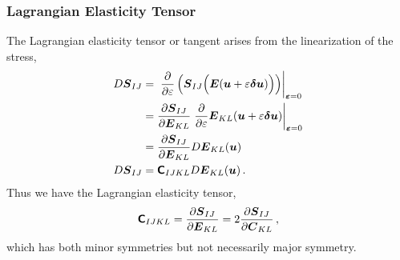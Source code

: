 \documentclass[10pt,letterpaper,oneside]{report}
\newcommand{\ten}[1]{\mbox{\boldmath $#1$}{}}
\newcommand{\tenf}[1]{\mbox{{\sffamily{\bfseries {#1}}}}}
\newcommand{\tens}[1]{\mbox{\boldmath{\scriptsize{$#1$}}}{}}
\begin{document}
\begin{itemize}
\subsubsection{Lagrangian Elasticity Tensor}
The Lagrangian elasticity tensor or tangent arises from the linearization of the stress, 
\begin{align}
D \ten{S}_{IJ} ={}& \left. \frac{\partial }{\partial \varepsilon} \left( \ten{S}_{IJ} \Big( \ten{E} (\ten{u} + \varepsilon \ten{\delta u} ) \Big) \right) \right|_{\tens{\varepsilon} = 0} 
\\
={}& \frac{ \partial \ten{S}_{IJ} }{ \partial \ten{E}_{KL} } \left. \frac{\partial }{\partial \varepsilon} \ten{E}_{KL} (\ten{u} + \varepsilon \ten{\delta u} ) \right|_{\tens{\varepsilon} = 0} 
\notag \\
={}& \frac{ \partial \ten{S}_{IJ} }{ \partial \ten{E}_{KL} }  D \ten{E}_{KL} (\ten{u} ) 
\notag \\
D \ten{S}_{IJ} ={}& \tenf{C}_{IJKL} D \ten{E}_{KL} (\ten{u} ) \, . 
\end{align}
Thus we have the Lagrangian elasticity tensor, 
\begin{equation}
\tenf{C}_{IJKL} = \frac{ \partial \ten{S}_{IJ} }{ \partial \ten{E}_{KL} } = 2 \frac{ \partial \ten{S}_{IJ} }{ \partial \ten{C}_{KL} } \, , 
\end{equation}
which has both minor symmetries but not necessarily major symmetry.  


\end{itemize}
\end{document}
